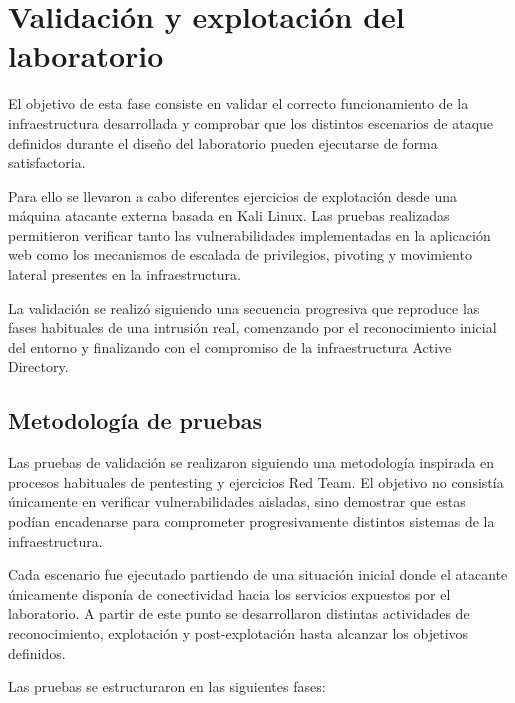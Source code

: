 \vspace*{-1cm}


\section{Validación y explotación del laboratorio}
\label{sec:validacion_y_explotacion_del_laboratorio}

El objetivo de esta fase consiste en validar el correcto funcionamiento de la infraestructura desarrollada y comprobar que los distintos escenarios de ataque definidos durante el diseño del laboratorio pueden ejecutarse de forma satisfactoria.

Para ello se llevaron a cabo diferentes ejercicios de explotación desde una máquina atacante externa basada en Kali Linux. Las pruebas realizadas permitieron verificar tanto las vulnerabilidades implementadas en la aplicación web como los mecanismos de escalada de privilegios, pivoting y movimiento lateral presentes en la infraestructura.

La validación se realizó siguiendo una secuencia progresiva que reproduce las fases habituales de una intrusión real, comenzando por el reconocimiento inicial del entorno y finalizando con el compromiso de la infraestructura Active Directory.


\subsection{Metodología de pruebas}

Las pruebas de validación se realizaron siguiendo una metodología inspirada en procesos habituales de pentesting y ejercicios Red Team. El objetivo no consistía únicamente en verificar vulnerabilidades aisladas, sino demostrar que estas podían encadenarse para comprometer progresivamente distintos sistemas de la infraestructura.

Cada escenario fue ejecutado partiendo de una situación inicial donde el atacante únicamente disponía de conectividad hacia los servicios expuestos por el laboratorio. A partir de este punto se desarrollaron distintas actividades de reconocimiento, explotación y post-explotación hasta alcanzar los objetivos definidos.

Las pruebas se estructuraron en las siguientes fases:

